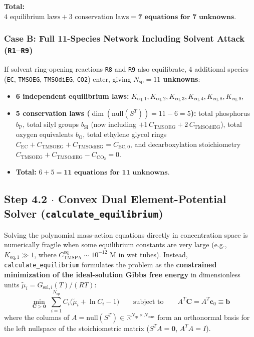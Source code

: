 \documentclass[11pt,a4paper]{article}
\begin{document}
\textbf{Total:} $4\text{ equilibrium laws} + 3\text{ conservation laws} = \mathbf{7\text{ equations for } 7\text{ unknowns}}$.

\subsubsection*{Case B: Full 11-Species Network Including Solvent Attack (\texttt{R1}--\texttt{R9})}

If solvent ring-opening reactions \texttt{R8} and \texttt{R9} also equilibrate, 4 additional species (\texttt{EC}, \texttt{TMSOEG}, \texttt{TMSOdiEG}, \texttt{CO2}) enter, giving \textbf{$N_{\text{sp}} = 11$ unknowns}:
\begin{itemize}[leftmargin=1.8em]
    \item \textbf{6 independent equilibrium laws:} $K_{\text{eq}, 1}, K_{\text{eq}, 2}, K_{\text{eq}, 3}, K_{\text{eq}, 4}, K_{\text{eq}, 8}, K_{\text{eq}, 9}$,
    \item \textbf{5 conservation laws ($\dim(\text{null}(S^T)) = 11 - 6 = 5$):} total phosphorus $b_{\text{P}}$, total silyl groups $b_{\text{Si}}$ (now including $+1\,C_{\text{TMSOEG}} + 2\,C_{\text{TMSOdiEG}}$), total oxygen equivalents $b_{\text{O}}$, total ethylene glycol rings $C_{\text{EC}} + C_{\text{TMSOEG}} + C_{\text{TMSOdiEG}} = C_{\text{EC}, 0}$, and decarboxylation stoichiometry $C_{\text{TMSOEG}} + C_{\text{TMSOdiEG}} - C_{\text{CO}_2} = 0$.
    \item \textbf{Total:} $6 + 5 = \mathbf{11\text{ equations for } 11\text{ unknowns}}$.
\end{itemize}

\subsection*{Step 4.2 $\cdot$ Convex Dual Element-Potential Solver (\texttt{calculate\_\allowbreak{}equilibrium})}

Solving the polynomial mass-action equations directly in concentration space is numerically fragile when some equilibrium constants are very large (e.g., $K_{\text{eq}, 1} \gg 1$, where $C_{\text{TMSPA}}^{\text{eq}} \sim 10^{-12}\text{ M}$ in wet tubes). Instead, \texttt{calculate\_\allowbreak{}equilibrium} formulates the problem as the \textbf{constrained minimization of the ideal-solution Gibbs free energy} in dimensionless units $\tilde{\mu}_i = G_{\text{sol}, i}(T) / (RT)$:
\begin{equation}
\min_{\mathbf{C} > \mathbf{0}} \; \sum_{i=1}^{N_{\text{sp}}} C_i \big( \tilde{\mu}_i + \ln C_i - 1 \big) \qquad \text{subject to} \qquad A^T \mathbf{C} = A^T \mathbf{c}_0 \equiv \mathbf{b}
\end{equation}
where the columns of $A = \text{null}(S^T) \in \mathbb{R}^{N_{\text{sp}} \times N_{\text{cons}}}$ form an orthonormal basis for the left nullspace of the stoichiometric matrix ($S^T A = \mathbf{0}$, $A^T A = I$).
\end{document}
